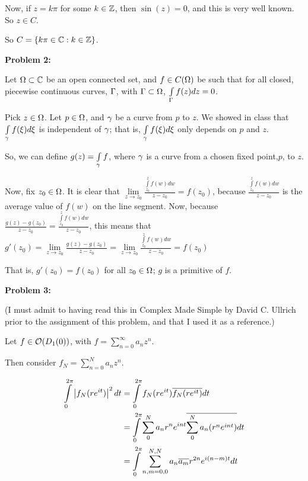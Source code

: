 \documentclass[a4paper,12pt]{article}
\begin{document}
Now, if $z = k\pi$ for some $k \in \mathbb{Z}$, then $\sin(z) = 0$, and this is very well known. So $z \in C$.

So $C = \{k\pi  \in \mathbb{C}: k \in \mathbb{Z}\}$.

\shunt

{\bf Problem 2:}

Let $\Omega \subset \mathbb{C}$ be an open connected set, and $f \in C(\Omega)$ be such that for all closed, piecewise continuous curves, $\Gamma$, with $\Gamma \subset \Omega$, $\int\limits_\Gamma f(z) dz = 0$.

Pick $z \in \Omega$. Let $p \in \Omega$, and $\gamma$ be a curve from $p$ to $z$. We showed in class that $\int\limits_\gamma f(\xi) d\xi$ is independent of $\gamma$; that is, $\int\limits_\gamma f(\xi) d\xi$ only depends on $p$ and $z$.

So, we can define $g(z) = \int\limits_\gamma f$, where $\gamma$ is a curve from a chosen fixed point,$p$, to $z$.

Now, fix $z_0 \in \Omega$. It is clear that $\lim\limits_{z\to z_0} \frac{\int\limits_{z_0}^z f(w) dw}{z-z_0} = f(z_0)$, because $ \frac{\int\limits_{z_0}^z f(w) dw}{z-z_0}$ is the average value of $f(w)$ on the line segment. Now, because $\frac{g(z)-g(z_0)}{z-z_0} = \frac{\int\limits_{z_0}^z f(w) dw}{z-z_0}$, this means that $g'(z_0) = \lim\limits_{z\to z_0}\frac{g(z)-g(z_0)}{z-z_0} = \lim\limits_{z\to z_0}\frac{\int\limits_{z_0}^z f(w) dw}{z-z_0} = f(z_0)$

That is, $g'(z_0) = f(z_0)$ for all $z_0 \in \Omega$; $g$ is a primitive of $f$.



\shunt

{\bf Problem 3:}

(I must admit to having read this in Complex Made Simple by David C. Ullrich prior to the assignment of this problem, and that I used it as a reference.)

Let $f \in \mathcal{O}(D_1(0))$, with $f = \sum\limits_{n=0}^\infty a_nz^n$.

Then consider $f_N = \sum\limits_{n=0}^N a_nz^n$.

\begin{align*}
\int\limits_0^{2\pi} \left\lvert f_N(re^{it}) \right\rvert^2 dt &= \int\limits_0^{2\pi} f_N(re^{it})\overline{f_N(re^{it})} dt\\
&= \int\limits_0^{2\pi} \sum\limits_0^N a_nr^ne^{int}\overline{\sum\limits_0^Na_n(r^ne^{int})} dt\\
&= \int\limits_0^{2\pi} \sum\limits_{n,m=0,0}^{N,N} a_n\overline{a_m}r^{2n}e^{i(n-m)t} dt\\
\end{align*}
\end{document}
